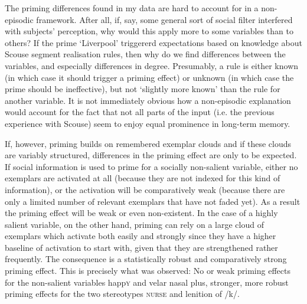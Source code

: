 The priming differences found in my data are hard to account for in a non-episodic framework.
After all, if, say, some general sort of social filter \parencite[cf.][]{niedzielski1999} interfered with subjects' perception, why would this apply more to some variables than to others?
If the prime \enquote*{Liverpool} triggererd expectations based on knowledge about Scouse segment realisation rules, then why do we find differences between the variables, and especially differences in degree.
Presumably, a rule is either known (in which case it should trigger a priming effect) or unknown (in which case the prime should be ineffective), but not \enquote*{slightly more known} than the rule for another variable.
It is not immediately obvious how a non-episodic explanation would account for the fact that not all parts of the input (i.e. the previous experience with Scouse) seem to enjoy equal prominence in long-term memory.

If, however, priming builds on remembered exemplar clouds and if these clouds are variably structured, differences in the priming effect are only to be expected.
If social information is used to prime for a socially non-salient variable, either no exemplars are activated at all (because they are not indexed for this kind of information), or the activation will be comparatively weak (because there are only a limited number of relevant exemplars that have not faded yet).
As a result the priming effect will be weak or even non-existent.
In the case of a highly salient variable, on the other hand, priming can rely on a large cloud of exemplars which activate both easily and strongly since they have a higher baseline of activation to start with, given that they are strengthened rather frequently.
The consequence is a statistically robust and comparatively strong priming effect.
This is precisely what was observed: No or weak priming effects for the non-salient variables happ\textsc{y} and velar nasal plus, stronger, more robust priming effects for the two stereotypes \textsc{nurse} and lenition of /k/.

